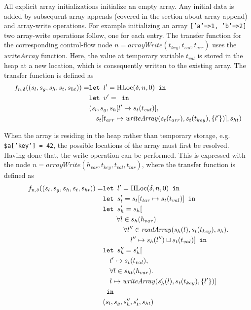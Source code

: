 All explicit array initializations initialize an empty array. Any initial data is added by subsequent array-appends (covered in the section about array append) and array-write operations. For example initializing an array \texttt{['a'=>1, 'b'=>2]} two array-write operations follow, one for each entry. The transfer function for the corresponding control-flow node $n = \mathit{arrayWrite}(t_{key},t_{val},t_{arr})$ uses the $\mathit{writeArray}$ function. Here, the value at temporary variable $t_{val}$ is stored in the heap at a new location, which is consequently written to the existing array. The transfer function is defined as
\begin{align}
f_{n,\delta}((s_l, s_g, s_h, s_t, s_{ht})) = & \texttt{let } l' = \text{HLoc}(\delta, n, 0) \texttt{ in }\notag\\
                            & \texttt{let } v' =  \texttt{ in }\notag\\
                            &(s_l, s_g, s_h[l'\mapsto s_t(t_{val})], \notag\\
                            &\quad s_t[t_{arr} \mapsto \mathit{writeArray}(s_t(t_{arr}), s_t(t_{key}), \{l'\})], s_{ht})
\end{align}

When the array is residing in the heap rather than temporary storage, e.g. \texttt{\$a['key'] = 42}, the possible locations of the array must first be resolved. Having done that, the write operation can be performed. This is expressed with the node $n = \mathit{arrayWrite}(h_{var}, t_{key},t_{val},t_{tar})$, where the transfer function is defined as
\begin{align}
f_{n,\delta}((s_l, s_g, s_h, s_t, s_{ht})) = &\texttt{let } l' = \text{HLoc}(\delta, n, 0) \texttt{ in } \notag\\
                            &\texttt{let } s_t' = s_t[t_{tar}\mapsto s_t(t_{val})] \texttt{ in }\notag\\
                            &\texttt{let } s_h' =  s_h[\notag\\
                            &\quad\quad\forall l \in s_h(h_{var}).\notag\\
                            &\quad\quad\quad\forall l'' \in \mathit{readArray}(s_h(l), s_t(t_{key}), s_h).\notag\\
                            &\quad\quad\quad\quad l''\mapsto s_h(l'') \sqcup s_t(t_{val})] \texttt{ in }\notag\\
                            &\texttt{let } s_h'' = s_h'[\notag\\
                            &\quad l' \mapsto s_t(t_{val}), \notag\\
                            &\quad \forall l \in s_{ht}(h_{var}).\notag\\
                            &\quad l\mapsto \mathit{writeArray}(s_h'(l), s_t(t_{key}), \{l'\})]\notag\\
                            & \texttt{ in }\notag\\
                            &(s_l, s_g, s_h'', s_t', s_{ht})
\end{align}

